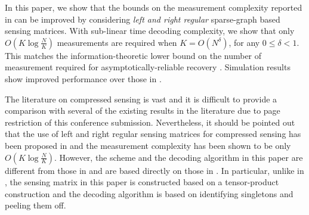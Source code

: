 \documentclass[conference]{IEEEtran}
\begin{document}
In this paper, we show that the bounds on the measurement complexity reported in \cite{li2015subisit,li2015subdraft} can be improved by considering \emph{left and right regular} sparse-graph based sensing matrices. With sub-linear time decoding complexity, we show that only $O\left(K \log \frac{N}{K} \right)$ measurements are required when $K = O(N^\delta)$, for any $0 \leq \delta < 1$.  This matches the information-theoretic lower bound on the number of measurement required for asymptotically-reliable recovery \cite{wainwright2009information}.
Simulation results show improved performance over those in \cite{li2015subdraft}.

The literature on compressed sensing is vast and it is difficult to provide a comparison with several of the existing results in the literature due to page restriction of this conference submission. Nevertheless, it should be pointed out that the use of left and right regular sensing matrices for compressed sensing has been proposed in \cite{jafarpour2009efficient} and the measurement complexity has been shown to be only $O\left(K \log \frac{N}{K} \right)$. However, the scheme and the decoding algorithm in this paper are different from those in \cite{jafarpour2009efficient} and are based directly on those in \cite{li2015subisit,li2015subdraft}. In particular, unlike in \cite{jafarpour2009efficient}, the sensing matrix in this paper is constructed based on a tensor-product construction and the decoding algorithm is based on identifying singletons and peeling them off.
\end{document}
